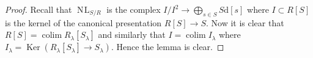 \documentclass[10pt,a4paper]{amsart}
\theoremstyle{plain}
\theoremstyle{definition}
\theoremstyle{remark}
\numberwithin{equation}{subsection}
\def\colim{\mathop{\mathrm{colim}}\nolimits}
\def\NL{\mathop{N\!L}\nolimits}
\def\Ker{\mathop{\mathrm{Ker}}}
\begin{document}
\begin{proof}
Recall that $\NL_{S/R}$ is the complex
$I/I^2 \to \bigoplus_{s \in S} S\text{d}[s]$ where $I \subset R[S]$
is the kernel of the canonical presentation $R[S] \to S$.
Now it is clear that $R[S] = \colim R_\lambda[S_\lambda]$ and similarly
that $I = \colim I_\lambda$ where
$I_\lambda = \Ker(R_\lambda[S_\lambda] \to S_\lambda)$.
Hence the lemma is clear.
\end{proof}
\end{document}

